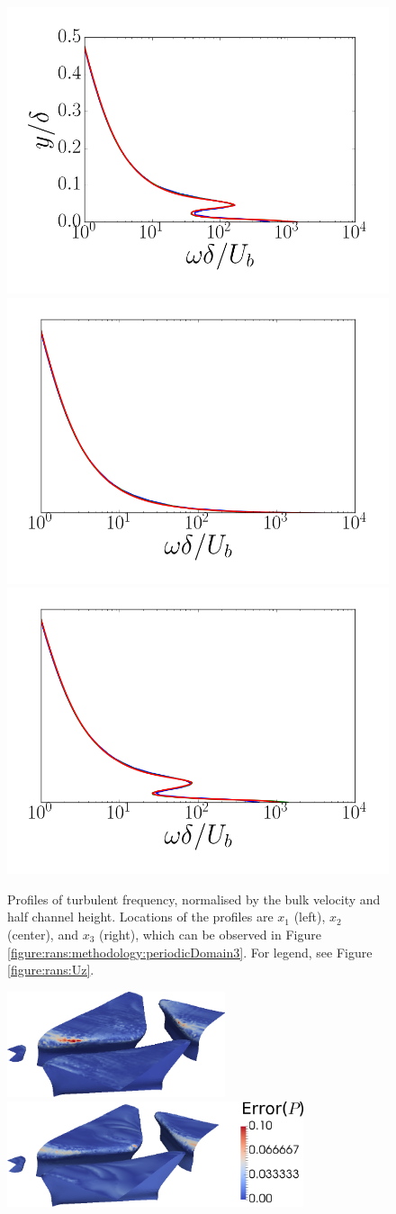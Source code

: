 \documentclass[12pt,oneside,a4paper]{article}
\begin{document}
\begin{figure}
\centering
\includegraphics[width=0.33\linewidth]{images/CFD_meshIndependence/X1_omega.png}\hfill \includegraphics[width=0.33\linewidth]{images/CFD_meshIndependence/X2_omega.png}\hfill
\includegraphics[width=0.33\linewidth]{images/CFD_meshIndependence/X3_omega.png}\hfill\caption{Profiles of turbulent frequency, normalised by the bulk velocity and half channel height. Locations of the profiles are $x_1$ (left), $x_2$ (center), and $x_3$ (right), which can be observed in Figure \ref{figure:rans:methodology:periodicDomain3}. For legend, see Figure \ref{figure:rans:Uz}.}
\label{figure:rans:omega}
\end{figure}


\begin{figure}
\centering
\includegraphics[height=3.1cm]{images/CFD_meshIndependence/tc3_p.png}\hfill \includegraphics[height=3.1cm]{images/CFD_meshIndependence/tc5_p_bar.png}
\end{figure}
\end{document}
